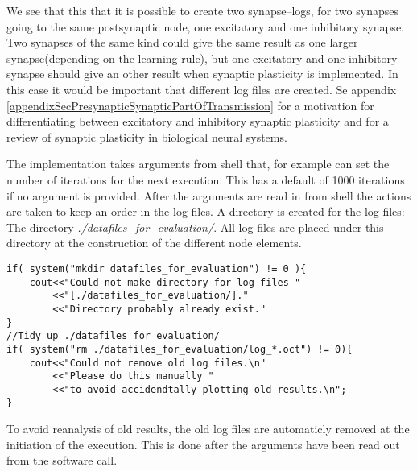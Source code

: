 We see that this that it is possible to create two synapse--logs, for two synapses going to the same postsynaptic node, one excitatory and one inhibitory synapse.
Two synapses of the same kind could give the same result as one larger synapse(depending on the learning rule), but one excitatory and one inhibitory synapse should give an other result when synaptic plasticity is implemented.
In this case it would be important that different log files are created.
Se appendix \ref{appendixSecPresynapticSynapticPartOfTransmission} for a motivation for differentiating between excitatory and inhibitory synaptic plasticity and 
	for a review of synaptic plasticity in biological neural systems.


The implementation takes arguments from shell that, for example can set the number of iterations for the next execution.
This has a default of 1000 iterations if no argument is provided.
After the arguments are read in from shell the actions are taken to keep an order in the log files.
A directory is created for the log files: The directory \emph{./datafiles\_for\_evaluation/}.
All log files are placed under this directory at the construction of the different node elements.
\begin{lstlisting}
if( system("mkdir datafiles_for_evaluation") != 0 ){
	cout<<"Could not make directory for log files "
	    <<"[./datafiles_for_evaluation/]."
		<<"Directory probably already exist."
}
//Tidy up ./datafiles_for_evaluation/
if( system("rm ./datafiles_for_evaluation/log_*.oct") != 0){
	cout<<"Could not remove old log files.\n"
	    <<"Please do this manually "
	    <<"to avoid accidendtally plotting old results.\n";
}
\end{lstlisting}
To avoid reanalysis of old results, the old log files are automaticly removed at the initiation of the execution.
This is done after the arguments have been read out from the software call.






